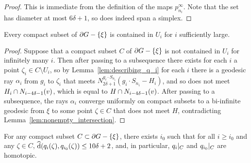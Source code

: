 \documentclass[a4paper]{article}
\begin{document}
\begin{proof}
  This is immediate from the definition of the maps $p^\infty_{n_i}$. Note that
  the set has diameter at most $6\delta+1$, so does indeed span a simplex.
\end{proof}

\begin{lemma}
  Every compact subset of $\partial G - \left\{\xi\right\}$ is contained in $U_i$ for 
  $i$ sufficiently large.
\end{lemma} 

\begin{proof}
  Suppose that a compact subset $C$ of $\partial G - \left\{\xi\right\}$ is not contained
  in $U_i$ for infinitely many $i$. Then after passing to a subsequence there
  exists for each $i$ a point $\zeta_i \in C\setminus U_i$, so by
  Lemma~\ref{lem:describing_q_i} for each $i$ there is a geodesic ray
  $\alpha_i$ from $g_i$ to $\zeta_i$ that meets $N_{2\delta+1}^{g_i\cdot
  S_{n_i}}(g_i\cdot S_{n_i} - H_i)$, and so does not meet $H_i\cap
  N_{i-4\delta-1}(v)$, which is equal to $H \cap N_{i-4\delta-1}(v)$.
  After passing to a subsequence, the rays $\alpha_i$ converge uniformly on
  compact subsets to a bi-infinite geodesic from $\xi$ to some point $\zeta \in
  C$ that does not meet $H$, contradicting
  Lemma~\ref{lem:nonempty_intersection}.
\end{proof}

\begin{lemma}\label{lem:affinehomotopic}
  For any compact subset $C\subset\partial G - \left\{\xi\right\}$, there exists $i_0$ 
  such that for all $i \geq i_0$ and any $\zeta \in C$, $\operatorname{\widehat{d}}(q_i(\zeta),
  q_{i_0}(\zeta)) \leq 10\delta + 2$, and, in particular, $q_i\vert_{C}$
  and $q_{i_0}\vert_{C}$ are homotopic.
\end{lemma}
\end{document}
